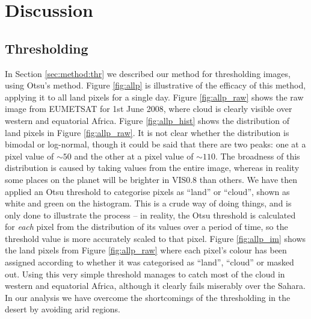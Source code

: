 

\section{Discussion}
\label{sec:disc}
\subsection{Thresholding}
\label{sec:disc:thresh}
In Section \ref{sec:method:thr} we described our method for thresholding images,
using Otsu's method. Figure \ref{fig:allp} is illustrative of the efficacy of
this method, applying it to all land pixels for a single day. Figure
\ref{fig:allp_raw} shows the raw image from EUMETSAT for 1st June 2008, where
cloud is clearly visible over western and equatorial Africa. Figure
\ref{fig:allp_hist} shows the distribution of land pixels in Figure
\ref{fig:allp_raw}. It is not clear whether the distribution is bimodal or
log-normal, though it could be said that there are two peaks: one at a pixel
value of $\sim50$ and the other at a pixel value of $\sim110$. The broadness of this
distribution is caused by taking values from the entire image, whereas in
reality some places on the planet will be brighter in VIS0.8 than others. We
have then applied an Otsu threshold to categorise pixels as ``land'' or
``cloud'', shown as white and green on the histogram. This is a crude way of
doing things, and is only done to illustrate the process -- in reality, the Otsu
threshold is calculated for \emph{each} pixel from the distribution of its
values over a period of time, so the threshold value is more accurately scaled
to that pixel. Figure \ref{fig:allp_im} shows the land pixels from Figure
\ref{fig:allp_raw} where each pixel's colour has been assigned according to
whether it was categorised as ``land'', ``cloud'' or masked out. Using this very
simple threshold manages to catch most of the cloud in western and equatorial
Africa, although it clearly fails miserably over the Sahara. In our analysis we
have overcome the shortcomings of the thresholding in the desert by avoiding
arid regions.
